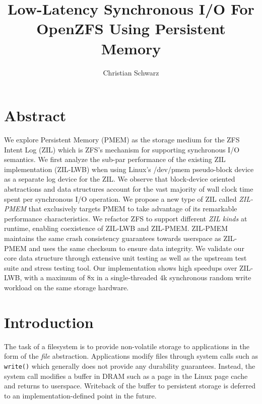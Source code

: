 \documentclass[12pt,a4paper,twoside]{book}
\begin{document}
\frontmatter
{}

\title{Low-Latency Synchronous I/O For OpenZFS Using Persistent Memory}
\author{Christian Schwarz}
\maketitle



\chapter{Abstract}
We explore Persistent Memory (PMEM) as the storage medium for the ZFS Intent Log (ZIL) which is ZFS's mechanism for supporting synchronous I/O semantics.
We first analyze the sub-par performance of the existing ZIL implementation (ZIL-LWB) when using Linux's /dev/pmem pseudo-block device as a separate log device for the ZIL.
We observe that block-device oriented abstractions and data structures account for the vast majority of wall clock time spent per synchronous I/O operation.
We propose a new type of ZIL called \textit{ZIL-PMEM} that exclusively targets PMEM to take advantage of its remarkable performance characteristics.
We refactor ZFS to support different \textit{ZIL kinds} at runtime, enabling coexistence of ZIL-LWB and ZIL-PMEM.
ZIL-PMEM maintains the same crash consistency guarantees towards userspace as ZIL-PMEM and uses the same checksum to ensure data integrity.
We validate our core data structure through extensive unit testing as well as the upstream test suite and stress testing tool.
Our implementation shows high speedups over ZIL-LWB, with a maximum of 8x in a single-threaded 4k synchronous random write workload on the same storage hardware.

\mainmatter
\cleardoublepage
{}
{}
\tableofcontents

\chapter{Introduction}
The task of a filesystem is to provide non-volatile storage to applications in the form of the \textit{file} abstraction.
Applications modify files through system calls such as \lstinline{write()} which generally does not provide any durability guarantees.
Instead, the system call modifies a buffer in DRAM such as a page in the Linux page cache and returns to userspace.
Writeback of the buffer to persistent storage is deferred to an implementation-defined point in the future.
\end{document}
